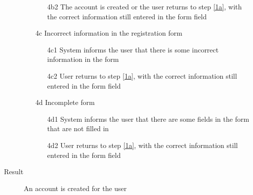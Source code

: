 \begin{description}
\begin{enumerate}
\begin{itemize}
								\item[4b2] The account is created or the user returns to step \ref{1a}, with the correct information still entered in the form field
							\end{itemize}
						\item[4c] Incorrect information in the registration form
							\begin{itemize}
								\item[4c1] System informs the user that there is some incorrect information in the form 
								\item[4c2] User returns to step \ref{1a}, with the correct information still entered in the form field
							\end{itemize}
						\item[4d] Incomplete form
							\begin{itemize}
								\item[4d1] System informs the user that there are some fields in the form that are not filled in
								\item[4d2] User returns to step \ref{1a}, with the correct information still entered in the form field
							\end{itemize}			
					\end{enumerate}
				\item[Result] An account is created for the user
			\end{description}
